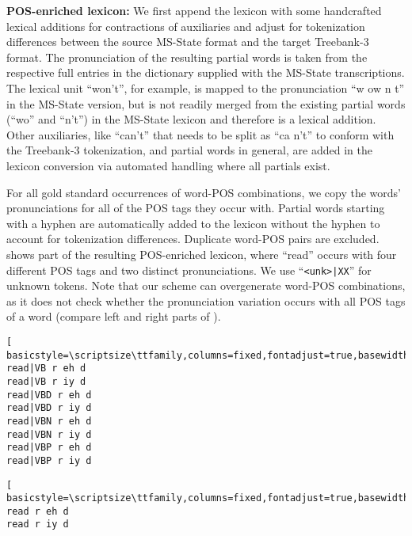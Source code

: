 \documentclass[11pt,letterpaper]{article}
\begin{document}
\textbf{POS-enriched lexicon:} We first append the lexicon with some handcrafted lexical additions for contractions of auxiliaries and adjust for tokenization differences between the source MS-State format and the target Treebank-3 format. The pronunciation of the resulting partial words is taken from the respective full entries in the dictionary supplied with the MS-State transcriptions. The lexical unit ``won't'', for example, is mapped to the pronunciation ``w ow n t'' in the MS-State version, but is not readily merged from the existing partial words (``wo'' and ``n't'') in the MS-State lexicon and therefore is a lexical addition. Other auxiliaries, like ``can't'' that needs to be split as ``ca n't'' to conform with the Treebank-3 tokenization, and partial words in general, are added in the lexicon conversion via automated handling where all partials exist.

For all gold standard occurrences of word-POS combinations, we copy the words' pronunciations for all of the POS tags they occur with. Partial words starting with a hyphen are automatically added to the lexicon without the hyphen to account for tokenization differences. Duplicate word-POS pairs are excluded.  shows part of the resulting POS-enriched lexicon, where ``read'' occurs with four different POS tags and two distinct pronunciations. 
We use ``\texttt{<unk>|XX}'' for unknown tokens.
Note that our scheme can overgenerate word-POS combinations, as it does not check whether the pronunciation variation occurs with all POS tags of a word (compare left and right parts of ). 
\begin{center}
\vspace{5pt}
\begin{minipage}[b]{0.45\columnwidth}
\begin{lstlisting}[
basicstyle=\scriptsize\ttfamily,columns=fixed,fontadjust=true,basewidth=0.5em,frame=tb]
read|VB r eh d
read|VB r iy d
read|VBD r eh d
read|VBD r iy d
read|VBN r eh d
read|VBN r iy d
read|VBP r eh d
read|VBP r iy d
\end{lstlisting}\end{minipage}
\begin{minipage}[b]{0.45\columnwidth}
\begin{lstlisting}[
basicstyle=\scriptsize\ttfamily,columns=fixed,fontadjust=true,basewidth=0.5em,frame=tb]
read r eh d
read r iy d
\end{lstlisting}
\end{minipage}
\label{fig:lex}
\vspace{5pt}
\end{center}
\end{document}
